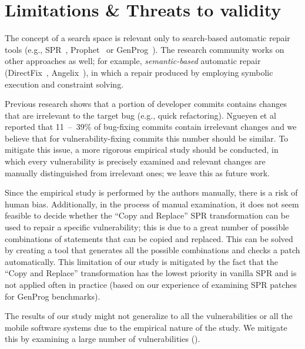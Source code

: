 \section{Limitations \& Threats to validity}
\label{section:limitations}

The concept of a search space is relevant only to search-based automatic repair tools (e.g., SPR~\cite{long2015staged}, Prophet~\cite{long2015prophet} or GenProg~\cite{le2012systematic}).
The research community works on other approaches as well; for example, \emph{semantic-based} automatic repair (DirectFix~\cite{directfix}, Angelix~\cite{mechtaev2016angelix}), in which a repair produced by employing symbolic execution and constraint solving.

Previous research shows that a portion of developer commits contains changes that are irrelevant to the target bug (e.g., quick refactoring).
Ngueyen et al~\cite{nguyen2013filtering} reported that 11~--~39\% of bug-fixing commits contain irrelevant changes and we believe that for vulnerability-fixing commits this number should be similar.
To mitigate this issue, a more rigorous empirical study should be conducted, in which every vulnerability is precisely examined and relevant changes are manually distinguished from irrelevant ones; we leave this as future work.

Since the empirical study is performed by the authors manually, there is a risk of human bias.
Additionally, in the process of manual examination, it does not seem feasible to decide whether the ``Copy and Replace'' SPR transformation can be used to repair a specific vulnerability; this is due to a great number of possible combinations of statements that can be copied and replaced.
This can be solved by creating a tool that generates all the possible combinations and checks a patch automatically.
This limitation of our study is mitigated by the fact that the ``Copy and Replace'' transformation has the lowest priority in vanilla SPR and is not applied often in practice (based on our experience of examining SPR patches for GenProg benchmarks).

The results of our study might not generalize to all the vulnerabilities or all the mobile software systems due to the empirical nature of the study.
We mitigate this by examining a large number of vulnerabilities (\numvuln).
